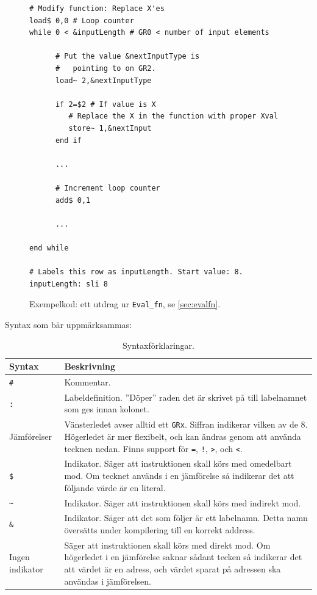 \documentclass[]{article}
\begin{document}
\begin{figure}[h]
\centering
\begin{oframed}
\begin{verbatim}
# Modify function: Replace X'es
load$ 0,0 # Loop counter
while 0 < &inputLength # GR0 < number of input elements
      
      # Put the value &nextInputType is 
      #   pointing to on GR2.
      load~ 2,&nextInputType

      if 2=$2 # If value is X
      	 # Replace the X in the function with proper Xval
      	 store~ 1,&nextInput
      end if

      ...

      # Increment loop counter
      add$ 0,1

      ...

end while

# Labels this row as inputLength. Start value: 8.
inputLength: sli 8
\end{verbatim}
\end{oframed}
\caption{Exempelkod: ett utdrag ur \texttt{Eval\_fn}, se \ref{sec:evalfn}.}
\end{figure}

\newpage

\noindent
Syntax som bär uppmärksammas:\\

\begin{table}[H]
\centering
\begin{tabular}{p{2.5cm} p{8.5cm}}
\textbf{Syntax} & \textbf{Beskrivning}\\
\hline
\texttt{\#} & Kommentar.\\
\texttt{:} & Labeldefinition. ''Döper'' raden det är skrivet på till labelnamnet som ges innan kolonet.\\
Jämförelser & Vänsterledet avser alltid ett \texttt{GRx}. Siffran indikerar vilken av de 8. Högerledet är mer flexibelt, och kan ändras genom att använda tecknen nedan. Finns support för \texttt{=}, \texttt{!}, \texttt{>}, och \texttt{<}.\\
\texttt{\$} & Indikator. Säger att instruktionen skall körs med omedelbart mod. Om tecknet används i en jämförelse så indikerar det att följande värde är en literal.\\
\texttt{\~{ }}  & Indikator. Säger att instruktionen skall körs med indirekt mod.\\
\texttt{\&} & Indikator. Säger att det som följer är ett labelnamn. Detta namn översätts under kompilering till en korrekt address.\\
Ingen indikator & Säger att instruktionen skall körs med direkt mod. Om högerledet i en jämförelse saknar sådant tecken så indikerar det att värdet är en adress, och värdet sparat på adressen ska användas i jämförelsen.\\
\end{tabular}
\caption{Syntaxförklaringar.}
\end{table}
\end{document}
